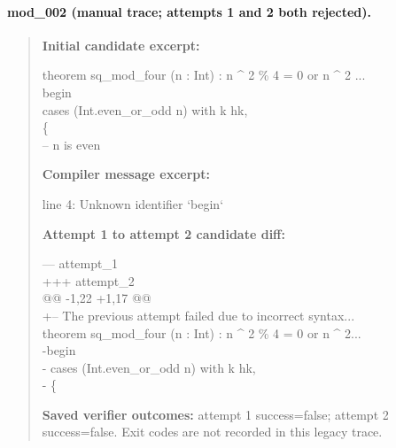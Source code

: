 \paragraph{mod\_002 (manual trace; attempts 1 and 2 both rejected).}
\begin{quote}\small
\textbf{Initial candidate excerpt:}\par\ttfamily
theorem sq\_mod\_four (n : Int) : n \textasciicircum{} 2 \% 4 = 0 or n \textasciicircum{} 2 ...\\
begin\\
  cases (Int.even\_or\_odd n) with k hk,\\
  \{\\
    -- n is even\\
\par\textbf{Compiler message excerpt:}\par\ttfamily
line 4: Unknown identifier `begin`\\
\par\textbf{Attempt 1 to attempt 2 candidate diff:}\par\ttfamily
--- attempt\_1\\
+++ attempt\_2\\
@@ -1,22 +1,17 @@\\
+-- The previous attempt failed due to incorrect syntax...\\
 theorem sq\_mod\_four (n : Int) : n \textasciicircum{} 2 \% 4 = 0 or n \textasciicircum{} 2...\\
-begin\\
-  cases (Int.even\_or\_odd n) with k hk,\\
-  \{\\
\par\textbf{Saved verifier outcomes:} attempt 1 success=false; attempt 2 success=false. Exit codes are not recorded in this legacy trace.
\end{quote}
